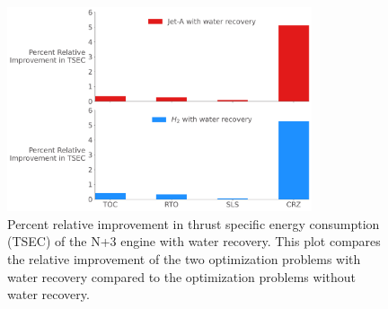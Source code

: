 \documentclass[conf]{new-aiaa}
\begin{document}
\begin{figure}[hbt!]
    \centering
    \includegraphics[width=0.8\textwidth]{JetA-H2_TSEC_diff.pdf}
    \caption{Percent relative improvement in thrust specific energy consumption (TSEC) of the N+3 engine with water recovery.
        This plot compares the relative improvement of the two optimization problems with water recovery compared to the optimization problems without water recovery.}
    \label{fig:barchart}
\end{figure}
\end{document}
